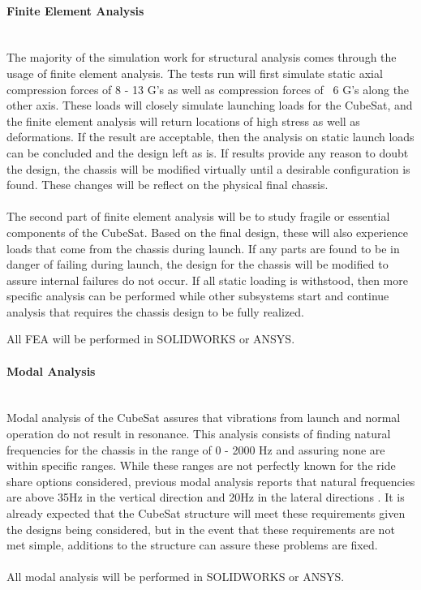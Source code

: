 \paragraph{Finite Element Analysis} ~\\

The majority of the simulation work for structural analysis comes through the usage of finite element analysis. The tests run will first simulate static axial compression forces of 8 - 13 G's as well as compression forces of ~6 G's along the other axis. These loads will closely simulate launching loads for the CubeSat, and the finite element analysis will return locations of high stress as well as deformations. If the result are acceptable, then the analysis on static launch loads can be concluded and the design left as is. If results provide any reason to doubt the design, the chassis will be modified virtually until a desirable configuration is found. These changes will be reflect on the physical final chassis.
\\
\\
The second part of finite element analysis will be to study fragile or essential components of the CubeSat. Based on the final design, these will also experience loads that come from the chassis during launch. If any parts are found to be in danger of failing during launch, the design for the chassis will be modified to assure internal failures do not occur. If all static loading is withstood, then more specific analysis can be performed while other subsystems start and continue analysis that requires the chassis design to be fully realized.

All FEA will be performed in SOLIDWORKS or ANSYS.
\paragraph{Modal Analysis} ~\\

Modal analysis of the CubeSat assures that vibrations from launch and normal operation do not result in resonance. This analysis consists of finding natural frequencies for the chassis in the range of 0 - 2000 Hz and assuring none are within specific ranges. While these ranges are not perfectly known for the ride share options considered, previous modal analysis reports that natural frequencies are above 35Hz in the vertical direction and 20Hz in the lateral directions \cite{FEA1, FEA5, FEA7}. It is already expected that the CubeSat structure will meet these requirements given the designs being considered, but in the event that these requirements are not met simple, additions to the structure can assure these problems are fixed.
~\\~\\
All modal analysis will be performed in SOLIDWORKS or ANSYS.
